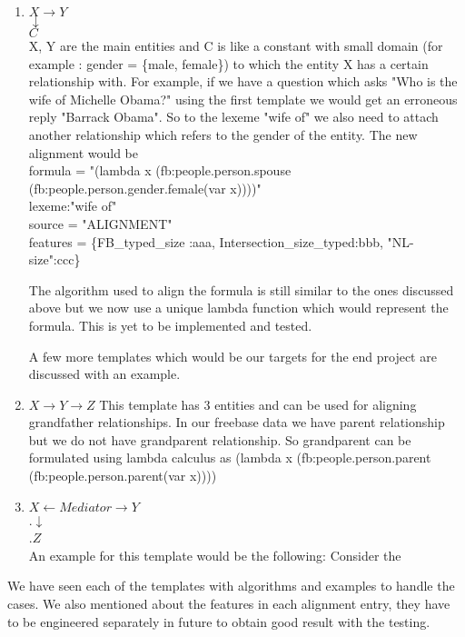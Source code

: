 \documentclass[12pt, a4paper]{article}
\begin{document}
\begin{enumerate}
	\item $X\rightarrow Y$\\
	 $\downarrow$\\
	 $C$\\
	X, Y are the main entities and C is like a constant with small domain (for example : gender = \{male, female\}) to which the entity X has a certain relationship with. For example, if we have a question which asks "Who is the wife of Michelle Obama?" using the first template we would get an erroneous reply "Barrack Obama". So to the lexeme "wife of" we also need to attach another relationship which refers to the gender of the entity. The new alignment would be\\
	
formula = "(lambda x (fb:people.person.spouse (fb:people.person.gender.female(var x))))"\\
lexeme:"wife of"\\
source = "ALIGNMENT"\\
features = \{FB\_typed\_size :aaa, Intersection\_size\_typed:bbb, "NL-size":ccc\}

The algorithm used to align the formula is still similar to the ones discussed above but we now use a unique lambda function which would represent the formula. This is yet to be implemented and tested.

A few more templates which would be our targets for the end project are discussed with an example.

\item $X \rightarrow Y \rightarrow Z$
This template has 3 entities and can be used for aligning grandfather relationships. In our freebase data we have parent relationship but we do not have grandparent relationship. So grandparent can be formulated using lambda calculus as (lambda x (fb:people.person.parent (fb:people.person.parent(var x))))

\item $X\leftarrow Mediator \rightarrow Y$\\
.\qquad\qquad$\downarrow$\\
.\qquad\qquad$Z$\\
An example for this template would be the following: Consider the 
	
\end{enumerate}

We have seen each of the templates with algorithms and examples to handle the cases. We also mentioned about the features in each alignment entry, they have to be engineered separately in future to obtain good result with the testing. 
\end{document}
